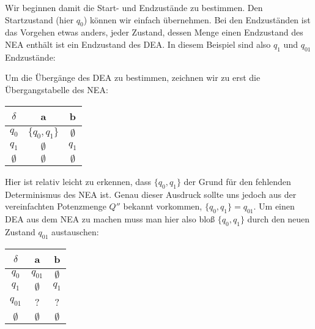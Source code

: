 \begin{flushleft}
Wir beginnen damit die Start- und Endzustände zu bestimmen.
Den Startzustand (hier $q_0$) können wir einfach übernehmen.
Bei den Endzuständen ist das Vorgehen etwas anders,
jeder Zustand, dessen Menge einen Endzustand des NEA enthält
ist ein Endzustand des DEA.
In diesem Beispiel sind also $q_1$ und $q_{01}$ Endzustände:
\end{flushleft}
    
\begin{center}
\end{center}

\begin{flushleft}
Um die Übergänge des DEA zu bestimmen, zeichnen wir zu erst
die Übergangstabelle des NEA:
\end{flushleft}
    
\begin{center}
\begin{tabular}{|c|c|c|}
    \hline
    $\delta$ & a & b \\
    \hline
    $q_0$ & $\{q_0,q_1\}$ & $\emptyset$ \\
    \hline
    $q_1$ & $\emptyset$ & $q_1$ \\
    \hline
    $\emptyset$ & $\emptyset$ & $\emptyset$ \\
    \hline
\end{tabular}
\end{center}

\begin{flushleft}
Hier ist relativ leicht zu erkennen, dass $\{q_0,q_1\}$ der Grund für den fehlenden 
Determinismus des NEA ist. Genau dieser Ausdruck sollte uns jedoch
aus der vereinfachten Potenzmenge $Q''$ bekannt vorkommen,
$\{q_0,q_1\}=q_{01}$. Um einen DEA aus dem NEA zu machen muss man hier also bloß 
$\{q_0,q_1\}$ durch den neuen Zustand $q_{01}$ austauschen:
\end{flushleft}

\begin{center}
\begin{tabular}{|c|c|c|}
    \hline
    $\delta$ & a & b \\
    \hline
    $q_0$ & $q_{01}$ & $\emptyset$ \\
    \hline
    $q_1$ & $\emptyset$ & $q_1$ \\
    \hline
    $q_{01}$ & ? & ? \\
    \hline
    $\emptyset$ & $\emptyset$ & $\emptyset$ \\
    \hline
\end{tabular}
\end{center}

